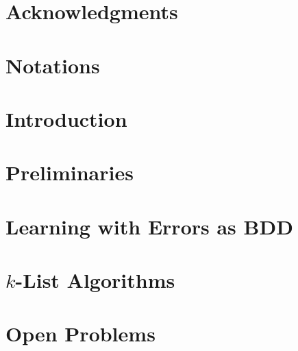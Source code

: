 \documentclass[a4paper,twoside,table,10pt,openright]{mythesis}
\begin{document}


\hypersetup{linkcolor = black, breaklinks=true}

\thispagestyle{empty} %

\clearpage

\thispagestyle{empty}


\chapter*{Acknowledgments}


%

\tableofcontents

\chapter*{Notations}


\chapter{Introduction}
\pagestyle{normal}

\label{chap:Intro}
\clearpage


\chapter{Preliminaries}
\label{chap:Prelim}
\pagestyle{normal}

\clearpage

\chapter{Learning with Errors as BDD}
\label{chap:LWEasBDD}
\pagestyle{special}




\chapter{$k$-List Algorithms}
\label{chap:kList}
\pagestyle{special}



\chapter*{Open Problems}








\def\shortbib{1}
%
%
%


\end{document}
